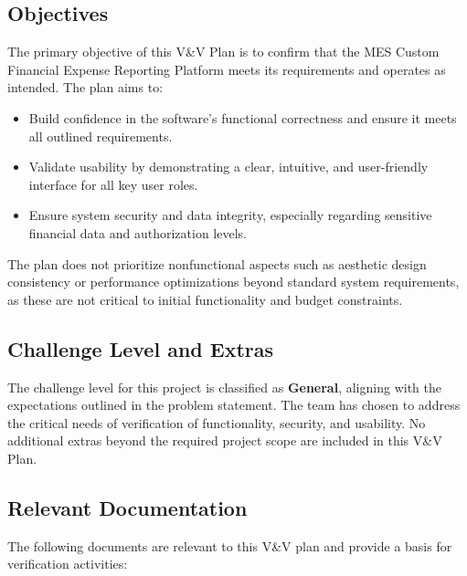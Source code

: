 \documentclass[12pt, titlepage]{article}
\begin{document}
\subsection{Objectives}

The primary objective of this V\&V Plan is to confirm that the MES Custom Financial Expense Reporting Platform meets its requirements and operates as intended. The plan aims to:
\begin{itemize}
    \item Build confidence in the software's functional correctness and ensure it meets all outlined requirements.
    \item Validate usability by demonstrating a clear, intuitive, and user-friendly interface for all key user roles.
    \item Ensure system security and data integrity, especially regarding sensitive financial data and authorization levels.
\end{itemize}

The plan does not prioritize nonfunctional aspects such as aesthetic design consistency or performance optimizations beyond standard system requirements, as these are not critical to initial functionality and budget constraints.

\subsection{Challenge Level and Extras}

The challenge level for this project is classified as \textbf{General}, aligning with the expectations outlined in the problem statement. The team has chosen to address the critical needs of verification of functionality, security, and usability. No additional extras beyond the required project scope are included in this V\&V Plan.

\subsection{Relevant Documentation}

The following documents are relevant to this V\&V plan and provide a basis for verification activities:
\end{document}

